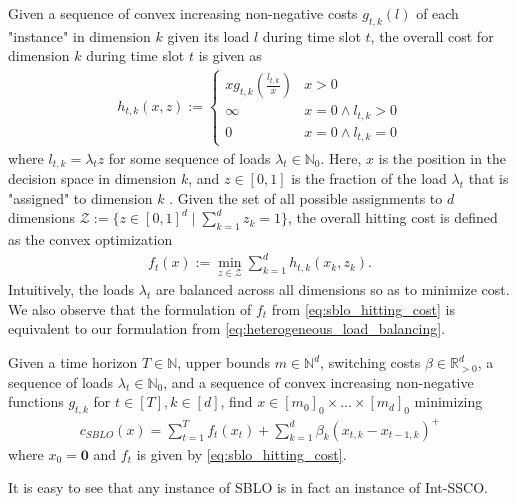 Given a sequence of convex increasing non-negative costs $g_{t,k}(l)$ of each "instance" in dimension $k$ given its load $l$ during time slot $t$, the overall cost for dimension $k$ during time slot $t$ is given as \begin{align*}
    h_{t,k}(x,z) := \begin{cases}
        x g_{t,k}\left(\frac{l_{t,k}}{x}\right) & x > 0 \\
        \infty                                  & x = 0 \land l_{t,k} > 0 \\
        0                                       & x = 0 \land l_{t,k} = 0
    \end{cases}
\end{align*} where $l_{t,k} = \lambda_t z$ for some sequence of loads $\lambda_t \in \mathbb{N}_0$. Here, $x$ is the position in the decision space in dimension $k$, and $z \in [0,1]$ is the fraction of the load $\lambda_t$ that is "assigned" to dimension $k$ \cite{Albers2021_2}. Given the set of all possible assignments to $d$ dimensions $\mathcal{Z} := \{z \in [0,1]^d \mid \sum_{k=1}^d z_k = 1\}$, the overall hitting cost is defined as the convex optimization \begin{align}
\label{eq:sblo_hitting_cost}
    f_t(x) := \min_{z \in \mathcal{Z}} \sum_{k=1}^d h_{t,k}(x_k,z_k).
\end{align} Intuitively, the loads $\lambda_t$ are balanced across all dimensions so as to minimize cost. We also observe that the formulation of $f_t$ from \autoref{eq:sblo_hitting_cost} is equivalent to our formulation from \autoref{eq:heterogeneous_load_balancing}.

\begin{problem}\label{problem:sblo}
Given a time horizon $T \in \mathbb{N}$, upper bounds $m \in \mathbb{N}^d$, switching costs $\beta \in \mathbb{R}_{>0}^d$, a sequence of loads $\lambda_t \in \mathbb{N}_0$, and a sequence of convex increasing non-negative functions $g_{t,k}$ for $t \in [T], k \in [d]$, find $x \in [m_0]_0 \times \dots \times [m_d]_0$ minimizing \begin{align*}
    c_{SBLO}(x) = \sum_{t=1}^T f_t(x_t) + \sum_{k=1}^d \beta_k (x_{t,k} - x_{t-1,k})^+
\end{align*}
where $x_0 = \mathbf{0}$ and $f_t$ is given by \autoref{eq:sblo_hitting_cost}.
\end{problem}

It is easy to see that any instance of SBLO is in fact an instance of Int-SSCO.

